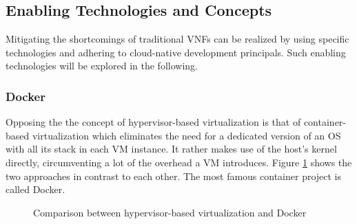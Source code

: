

\subsection{Enabling Technologies and Concepts}
Mitigating the shortcomings of traditional VNFs can be realized by using specific technologies and adhering to cloud-native development principals. Such enabling technologies will be explored in the following.

\subsubsection{Docker}
Opposing the the concept of hypervisor-based virtualization is that of container-based virtualization which eliminates the need for a dedicated version of an OS with all its stack in each VM instance. It rather makes use of the host's kernel directly, circumventing a lot of the overhead a VM introduces. Figure \ref{fig:docker} shows the two approaches in contrast to each other. The most famous container project is called Docker. 

\begin{figure}[h]%
	\centering
	\quad
	
	\caption{Comparison between hypervisor-based virtualization and Docker \cite{dockerdocu}}
	\label{fig:docker}
\end{figure}

